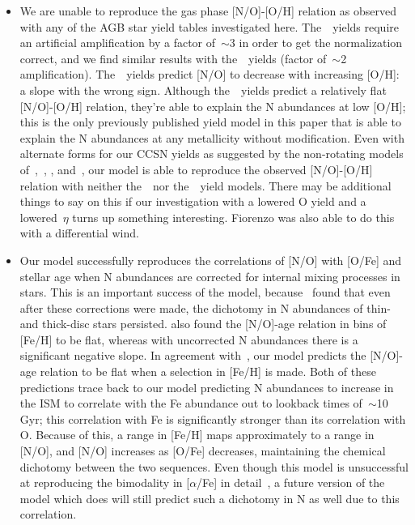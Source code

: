 \documentclass[ms.tex]{subfiles}
\begin{document}
\begin{itemize}
	\item We are unable to reproduce the gas phase [N/O]-[O/H] relation 
	as observed with any of the AGB star yield tables investigated here. 
	The~\cristallo~yields require an artificial amplification by a factor 
	of~$\sim$3 in order to get the normalization correct, and we find similar 
	results with the~\ventura~yields (factor of~$\sim$2 amplification). 
	The~\karakasten~yields predict [N/O] to decrease with increasing [O/H]: a 
	slope with the wrong sign. 
	Although the~\karakas~yields predict a relatively flat [N/O]-[O/H] 
	relation, they're able to explain the N abundances at low [O/H]; this is 
	the only previously published yield model in this paper that is able to 
	explain the N abundances at any metallicity without modification. 
	Even with alternate forms for our CCSN yields as suggested by the 
	non-rotating models of~\citet{Woosley1995},~\citet{Nomoto2013}, 
	\citet{Sukhbold2016}, and~\citet{Limongi2018}, our model is able to 
	reproduce the observed [N/O]-[O/H] relation with neither 
	the~\karakasten~nor the~\karakas~yield models. 
	{\color{red} 
	There may be additional things to say on this if our investigation with 
	a lowered O yield and a lowered~$\eta$ turns up something interesting. 
	Fiorenzo was also able to do this with a differential wind. 
	}

	\item Our model successfully reproduces the correlations of [N/O] 
	with [O/Fe] and stellar age when N abundances are corrected for internal 
	mixing processes in stars. 
	This is an important success of the model, because~\citet{Vincenzo2021} 
	found that even after these corrections were made, the dichotomy in N 
	abundances of thin- and thick-disc stars persisted. 
	\citet{Vincenzo2021} also found the [N/O]-age relation in bins of [Fe/H] to 
	be flat, whereas with uncorrected N abundances there is a significant 
	negative slope. 
	In agreement with~\citet{Vincenzo2021}, our model predicts the [N/O]-age 
	relation to be flat when a selection in [Fe/H] is made. 
	Both of these predictions trace back to our model predicting N abundances 
	to increase in the ISM to correlate with the Fe abundance out to lookback 
	times of~$\sim$10 Gyr; this correlation with Fe is significantly stronger 
	than its correlation with O. 
	Because of this, a range in [Fe/H] maps approximately to a range in [N/O], 
	and [N/O] increases as [O/Fe] decreases, maintaining the chemical 
	dichotomy between the two sequences. 
	Even though this model is unsuccessful at reproducing the bimodality in 
	[$\alpha$/Fe] in detail~\citep{Johnson2021}, a future version of the model 
	which does will still predict such a dichotomy in N as well due to this 
	correlation. 


\end{itemize}
\end{document}
